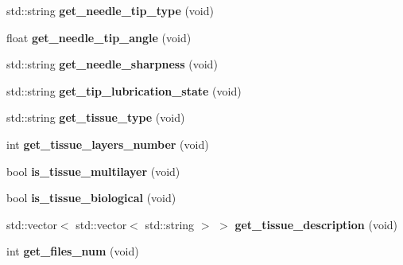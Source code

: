 \begin{DoxyCompactItemize}
\item 
\mbox{\label{classAxialForceDataset_ae57fb46bfad537233aa2a74f4cee3cc7}} 
std\+::string {\bfseries get\+\_\+needle\+\_\+tip\+\_\+type} (void)
\item 
\mbox{\label{classAxialForceDataset_a24d4eb1b3e4de4e94d50b7ae93e8984a}} 
float {\bfseries get\+\_\+needle\+\_\+tip\+\_\+angle} (void)
\item 
\mbox{\label{classAxialForceDataset_ac57adf1957b94194b99ed78d8f6bdb47}} 
std\+::string {\bfseries get\+\_\+needle\+\_\+sharpness} (void)
\item 
\mbox{\label{classAxialForceDataset_afefc64a6e5560a5b9bd32ecf0dbb5e3e}} 
std\+::string {\bfseries get\+\_\+tip\+\_\+lubrication\+\_\+state} (void)
\item 
\mbox{\label{classAxialForceDataset_ac1a33e004755d93b2c473d002b7bd77a}} 
std\+::string {\bfseries get\+\_\+tissue\+\_\+type} (void)
\item 
\mbox{\label{classAxialForceDataset_a9da890fd590aca338e77a4f18116a9d2}} 
int {\bfseries get\+\_\+tissue\+\_\+layers\+\_\+number} (void)
\item 
\mbox{\label{classAxialForceDataset_aa14c4018d50f736060e477cd34e88f07}} 
bool {\bfseries is\+\_\+tissue\+\_\+multilayer} (void)
\item 
\mbox{\label{classAxialForceDataset_a7274bca7bba646c83ef947a619c1d555}} 
bool {\bfseries is\+\_\+tissue\+\_\+biological} (void)
\item 
\mbox{\label{classAxialForceDataset_a2da0c6a510cfe31242b1be85d5ad3293}} 
std\+::vector$<$ std\+::vector$<$ std\+::string $>$ $>$ {\bfseries get\+\_\+tissue\+\_\+description} (void)
\item 
\mbox{\label{classAxialForceDataset_acaec564aee86c2fead32bfca08efc64f}} 
int {\bfseries get\+\_\+files\+\_\+num} (void)
\item 

\end{DoxyCompactItemize}
